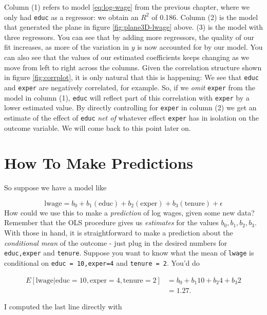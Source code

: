 \documentclass[]{book}
\newenvironment{Shaded}{\begin{snugshade}}{\end{snugshade}}
\newcommand{\CommentTok}[1]{\textcolor[rgb]{0.56,0.35,0.01}{\textit{#1}}}
\newcommand{\DecValTok}[1]{\textcolor[rgb]{0.00,0.00,0.81}{#1}}
\newcommand{\KeywordTok}[1]{\textcolor[rgb]{0.13,0.29,0.53}{\textbf{#1}}}
\newcommand{\NormalTok}[1]{#1}
\newcommand{\OperatorTok}[1]{\textcolor[rgb]{0.81,0.36,0.00}{\textbf{#1}}}
\newcommand{\StringTok}[1]{\textcolor[rgb]{0.31,0.60,0.02}{#1}}
\begin{document}
Column (1) refers to model \eqref{eq:log-wage} from the previous chapter, where we only had \texttt{educ} as a regressor: we obtain an \(R^2\) of 0.186. Column (2) is the model that generated the plane in figure \ref{fig:plane3D-lwage} above. (3) is the model with three regressors. You can see that by adding more regressors, the quality of our fit increases, as more of the variation in \(y\) is now accounted for by our model. You can also see that the values of our estimated coefficients keeps changing as we move from left to right across the columns. Given the correlation structure shown in figure \ref{fig:corrplot}, it is only natural that this is happening: We see that \texttt{educ} and \texttt{exper} are negatively correlated, for example. So, if we \emph{omit} \texttt{exper} from the model in column (1), \texttt{educ} will reflect part of this correlation with \texttt{exper} by a lower estimated value. By directly controlling for \texttt{exper} in column (2) we get an estimate of the effect of \texttt{educ} \emph{net of} whatever effect \texttt{exper} has in isolation on the outcome variable. We will come back to this point later on.

\hypertarget{make-preds}{%
\section{How To Make Predictions}\label{make-preds}}

So suppose we have a model like

\[\text{lwage} = b_0 + b_{1}(\text{educ}) + b_{2}(\text{exper}) + b_{3}(\text{tenure}) + \epsilon\]
How could we use this to make a \emph{prediction} of log wages, given some new data? Remember that the OLS procedure gives us \emph{estimates} for the values \(b_0,b_1, b_2,b_3\). With those in hand, it is straightforward to make a prediction about the \emph{conditional mean} of the outcome - just plug in the desired numbers for \texttt{educ,exper} and \texttt{tenure}. Suppose you want to know what the mean of \texttt{lwage} is conditional on \texttt{educ\ =\ 10,exper=4} and \texttt{tenure\ =\ 2}. You'd do

\begin{align}
E[\text{lwage}|\text{educ}=10,\text{exper}=4,\text{tenure}=2] &= b_0 + b_1  10 + b_2 4 + b_3  2\\
&= 1.27.
\end{align}

I computed the last line directly with

\begin{Shaded}
\end{Shaded}
\end{document}
